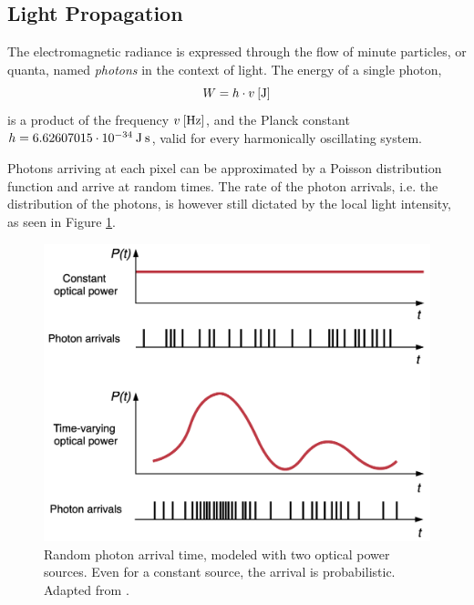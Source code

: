 
\subsection{Light Propagation}

The electromagnetic radiance is expressed through the flow of minute particles, or quanta, named \textit{photons} in the context of light. The energy of a single photon, \begin{equation}W = h \cdot v \: \textup{[J]}\end{equation}
is a product of the frequency $v \:\textup{[Hz]}$, and the Planck constant $h = 6.62607015 \cdot 10^{-34} 
\:\textup{J\:s}$, valid for every harmonically oscillating system.



Photons arriving at each pixel can be approximated by a Poisson  distribution function and arrive at random times. The rate of the photon arrivals, i.e. the distribution of the photons, is however still dictated by the local light intensity, as seen in Figure  \ref{fig:photon}. 


\begin{figure}[h]
  \centering
  \includegraphics[width=\linewidth]{imgs/optics/photon.png}
  \caption{Random photon arrival time, modeled with two optical power sources. Even for a constant source, the arrival is probabilistic. Adapted from \cite{Saleh1991}.}
  \label{fig:photon}
\end{figure}

